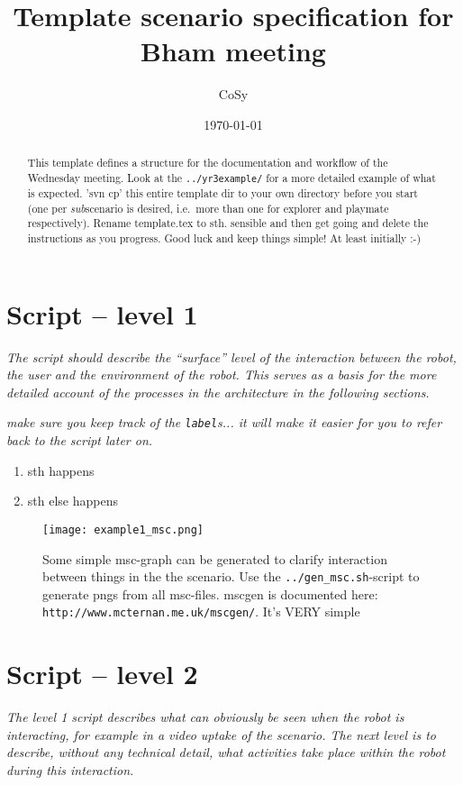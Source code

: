 \documentclass{article}
\title{Template scenario specification for Bham meeting}
\date{\today}
\author{CoSy}
\begin{document}
\maketitle
\begin{abstract}
This template defines a structure for the documentation and workflow
of the Wednesday meeting. Look at the \texttt{../yr3example/} for a
more detailed example of what is expected. 'svn cp' this entire
template dir to your own directory before you start (one per
\emph{sub}scenario is desired, i.e.\ more than one for explorer and
playmate respectively). Rename template.tex to sth. sensible and then
get going and delete the instructions as you progress. Good luck and
keep things simple! At least initially :-)
\end{abstract}

\section{Script -- level 1}
\textit{
  The script should describe the ``surface'' level of the interaction
  between the robot, the user and the environment of the robot. This
  serves as a basis for the more detailed account of the processes in
  the architecture in the following sections.}

\textit{
  make sure you keep track of the \texttt{label}s... it will make it easier for
  you to refer back to the script later on. }

\begin{enumerate}
\item \label{lvl1:sth}
  sth happens
\item \label{lvl1:sth2}
  sth else happens
\end{enumerate}

\begin{figure}[ht]
\centering
\texttt{[image: example1\_msc.png]}
\caption{
  Some simple msc-graph can be generated to clarify interaction
  between things in the the scenario. Use the
  \texttt{../gen\_msc.sh}-script to generate pngs from all
  msc-files. mscgen is documented here:
  \texttt{http://www.mcternan.me.uk/mscgen/}. It's VERY simple}
\label{fig:lvl1}
\end{figure}


\section{Script -- level 2}
\textit{
  The level 1 script describes what can obviously be seen when the
  robot is interacting, for example in a video uptake of the
  scenario. The next level is to describe, without any technical
  detail, what activities take place within the robot during this
  interaction. }
\end{document}
